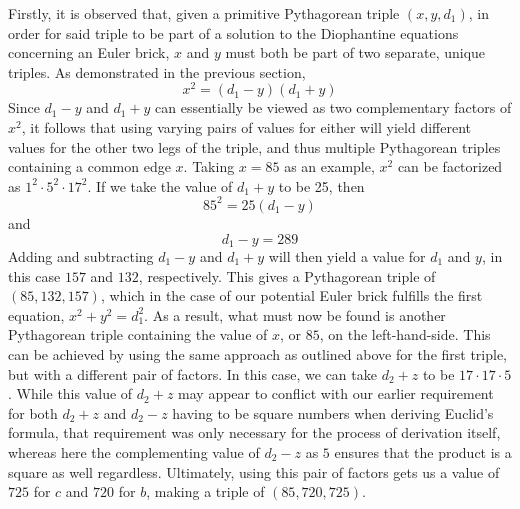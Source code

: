 \documentclass[11pt]{article}
\begin{document}
Firstly, it is observed that, given a primitive Pythagorean triple $(x, y, d_1)$, in order for said triple to be part of a solution to the Diophantine equations concerning an Euler brick, $x$ and $y$ must both be part of two separate, unique triples. As demonstrated in the previous section,
$$x^2=(d_1-y)(d_1+y)$$
Since $d_1-y$ and $d_1+y$ can essentially be viewed as two complementary factors of $x^2$, it follows that using varying pairs of values for either will yield different values for the other two legs of the triple, and thus multiple Pythagorean triples containing a common edge $x$. Taking $x=85$ as an example, $x^2$ can be factorized as $1^2\cdot{5}^2\cdot{17}^2$. If we take the value of $d_1+y$ to be 25, then
$$85^2=25(d_1-y)$$
and $$d_1-y=289$$
Adding and subtracting $d_1-y$ and $d_1+y$ will then yield a value for $d_1$ and $y$, in this case $157$ and $132$, respectively. This gives a Pythagorean triple of $(85, 132, 157)$, which in the case of our potential Euler brick fulfills the first equation, $x^2+y^2=d_1^2$. As a result, what must now be found is another Pythagorean triple containing the value of $x$, or $85$, on the left-hand-side. This can be achieved by using the same approach as outlined above for the first triple, but with a different pair of factors. In this case, we can take $d_2+z$ to be $17\cdot{17}\cdot{5}$. While this value of $d_2+z$ may appear to conflict with our earlier requirement for both $d_2+z$ and $d_2-z$ having to be square numbers when deriving Euclid's formula, that requirement was only necessary for the process of derivation itself, whereas here the complementing value of $d_2-z$ as $5$ ensures that the product is a square as well regardless. Ultimately, using this pair of factors gets us a value of $725$ for $c$ and $720$ for $b$, making a triple of $(85, 720, 725)$.
\end{document}
